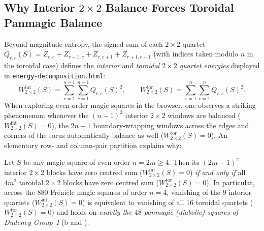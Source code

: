 \subsection{Why Interior \texorpdfstring{$2\times 2$}{2x2} Balance Forces Toroidal Panmagic Balance}

Beyond magnitude entropy, the signed sum of each $2\times 2$ quartet $Q_{r,c}(S) = Z_{r,c} + Z_{r+1,c} + Z_{r,c+1} + Z_{r+1,c+1}$ (with indices taken modulo $n$ in the toroidal case) defines the \emph{interior} and \emph{toroidal $2\times 2$ quartet energies} displayed in \texttt{energy-decomposition.html}:
\begin{equation}
  W_{2\times 2}^{\mathrm{int}}(S) = \sum_{r=1}^{n-1}\sum_{c=1}^{n-1} Q_{r,c}(S)^2, \qquad
  W_{2\times 2}^{\mathrm{tor}}(S) = \sum_{r=1}^{n}\sum_{c=1}^{n} Q_{r,c}(S)^2.
  \label{eq:quartet_energies}
\end{equation}
When exploring even-order magic squares in the browser, one observes a striking phenomenon: whenever the $(n-1)^2$ interior $2\times 2$ windows are balanced ($W_{2\times 2}^{\mathrm{int}}(S) = 0$), the $2n-1$ boundary-wrapping windows across the edges and corners of the torus automatically balance as well ($W_{2\times 2}^{\mathrm{tor}}(S) = 0$). An elementary row- and column-pair partition explains why:

\begin{lemma}
\label{lem:quartet_equivalence}
Let $S$ be any magic square of even order $n = 2m \ge 4$. Then its $(2m-1)^2$ interior $2\times 2$ blocks have zero centred sum ($W_{2\times 2}^{\mathrm{int}}(S) = 0$) \emph{if and only if} all $4m^2$ toroidal $2\times 2$ blocks have zero centred sum ($W_{2\times 2}^{\mathrm{tor}}(S) = 0$). In particular, across the $880$ Fr\'enicle magic squares of order $n=4$, vanishing of the $9$ interior quartets ($W_{2\times 2}^{\mathrm{int}}(S) = 0$) is equivalent to vanishing of all $16$ toroidal quartets ($W_{2\times 2}^{\mathrm{tor}}(S) = 0$) and holds on \emph{exactly the $48$ panmagic (diabolic) squares of Dudeney Group~I} (b and ).
\end{lemma}

